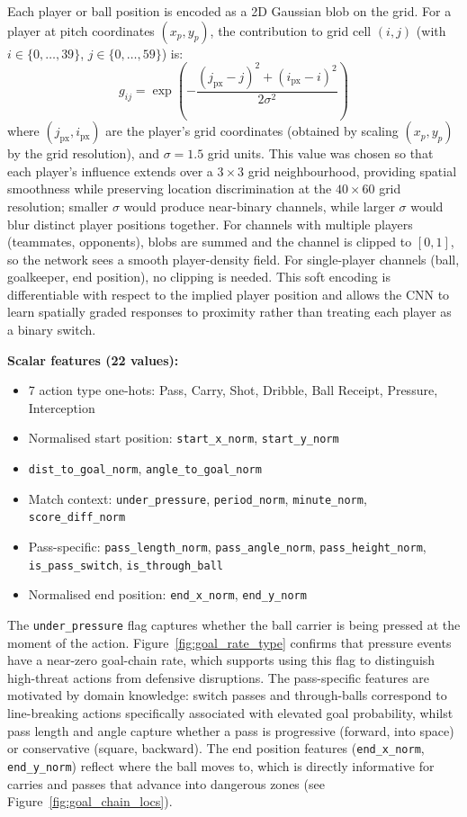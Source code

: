 Each player or ball position is encoded as a 2D Gaussian blob on the grid. For a player at pitch coordinates $(x_p, y_p)$, the contribution to grid cell $(i,j)$ (with $i \in \{0,\ldots,39\}$, $j \in \{0,\ldots,59\}$) is:
\[
    g_{ij} = \exp\!\left(-\frac{(j_\text{px} - j)^2 + (i_\text{px} - i)^2}{2\sigma^2}\right)
\]
where $(j_\text{px}, i_\text{px})$ are the player's grid coordinates (obtained by scaling $(x_p, y_p)$ by the grid resolution), and $\sigma = 1.5$ grid units. This value was chosen so that each player's influence extends over a $3{\times}3$ grid neighbourhood, providing spatial smoothness while preserving location discrimination at the $40{\times}60$ grid resolution; smaller $\sigma$ would produce near-binary channels, while larger $\sigma$ would blur distinct player positions together. For channels with multiple players (teammates, opponents), blobs are summed and the channel is clipped to $[0,1]$, so the network sees a smooth player-density field. For single-player channels (ball, goalkeeper, end position), no clipping is needed. This soft encoding is differentiable with respect to the implied player position and allows the CNN to learn spatially graded responses to proximity rather than treating each player as a binary switch.

\textbf{Scalar features (22 values):}
\begin{itemize}
    \item 7 action type one-hots: Pass, Carry, Shot, Dribble, Ball Receipt, Pressure, Interception
    \item Normalised start position: \texttt{start\_x\_norm}, \texttt{start\_y\_norm}
    \item \texttt{dist\_to\_goal\_norm}, \texttt{angle\_to\_goal\_norm}
    \item Match context: \texttt{under\_pressure}, \texttt{period\_norm}, \texttt{minute\_norm}, \texttt{score\_diff\_norm}
    \item Pass-specific: \texttt{pass\_length\_norm}, \texttt{pass\_angle\_norm}, \texttt{pass\_height\_norm}, \texttt{is\_pass\_switch}, \texttt{is\_through\_ball}
    \item Normalised end position: \texttt{end\_x\_norm}, \texttt{end\_y\_norm}
\end{itemize}

The \texttt{under\_pressure} flag captures whether the ball carrier is being pressed at the moment of the action. Figure~\ref{fig:goal_rate_type} confirms that pressure events have a near-zero goal-chain rate, which supports using this flag to distinguish high-threat actions from defensive disruptions. The pass-specific features are motivated by domain knowledge: switch passes and through-balls correspond to line-breaking actions specifically associated with elevated goal probability, whilst pass length and angle capture whether a pass is progressive (forward, into space) or conservative (square, backward). The end position features (\texttt{end\_x\_norm}, \texttt{end\_y\_norm}) reflect where the ball moves to, which is directly informative for carries and passes that advance into dangerous zones (see Figure~\ref{fig:goal_chain_locs}).

